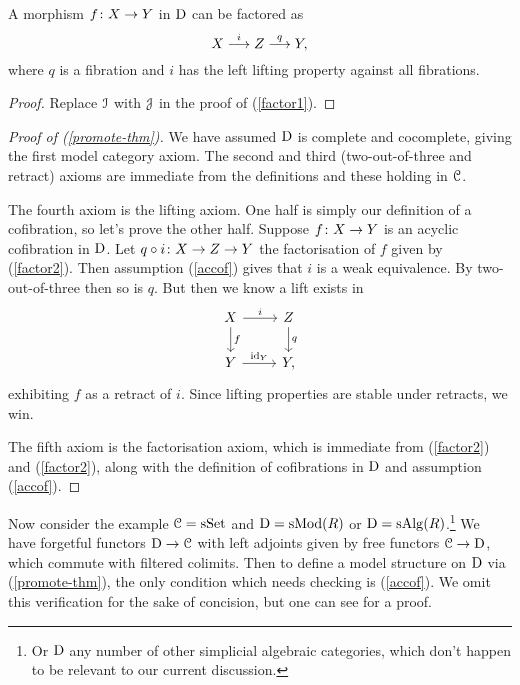 \begin{lemma}
  \label{factor2}
  A morphism $f \colon X \to Y$ in $\mathrm{D}$ can be factored as
  \[
  X \overset{i}{\longrightarrow} Z \overset{q}{\longrightarrow} Y,
  \]
  where $q$ is a fibration and $i$ has the left lifting property
  against all fibrations.
\end{lemma}

\begin{proof}
  Replace $\mathcal{I}$ with $\mathcal{J}$ in the proof of (\ref{factor1}).
\end{proof}


\begin{proof}[Proof of (\ref{promote-thm})]
  We have assumed $\mathrm{D}$ is complete and cocomplete, giving the first
  model category axiom. The second and third (two-out-of-three and
  retract) axioms are immediate from the definitions and these holding
  in $\mathcal{C}$.

  The fourth axiom is the lifting axiom. One half is simply our
  definition of a cofibration, so let's prove the other half. Suppose
  $f \colon X \to Y$ is an acyclic cofibration in $\mathrm{D}$. Let $q \circ i \colon X
  \to Z \to Y$ the factorisation of $f$ given by (\ref{factor2}). Then
  assumption (\ref{accof}) gives that $i$ is a weak equivalence. By
  two-out-of-three then so is $q$. But then we know a lift exists in
  \[
  \begin{tikzcd}
    X \rar{i} \dar{f} & Z \dar{q} \\ Y \rar{\id_Y} & Y,
  \end{tikzcd}
  \]
  exhibiting $f$ as a retract of $i$. Since lifting properties are
  stable under retracts, we win.

  The fifth axiom is the factorisation axiom, which is immediate from
  (\ref{factor2}) and (\ref{factor2}), along with the definition of
  cofibrations in $\mathrm{D}$ and assumption (\ref{accof}).
\end{proof}

\begin{nothing}
  \label{relevant-model}
  Now consider the example $\mathcal{C} = \mathrm{s}\mathrm{Set}$ and $\mathrm{D} = \mathrm{s}\mathrm{Mod}(R)$ or $\mathrm{D} =
  \mathrm{s}\mathrm{Alg}(R)$.\footnote{Or $\mathrm{D}$ any number of other simplicial
    algebraic categories, which don't happen to be relevant to our
    current discussion.}  We have forgetful functors $\mathrm{D} \to \mathcal{C}$ with
  left adjoints given by free functors $\mathcal{C} \to \mathrm{D}$, which commute with
  filtered colimits. Then to define a model structure on $\mathrm{D}$ via
  (\ref{promote-thm}), the only condition which needs checking is
  (\ref{accof}). We omit this verification for the sake of concision,
  but one can see \cite{goerssjardine} for a proof.
\end{nothing}

